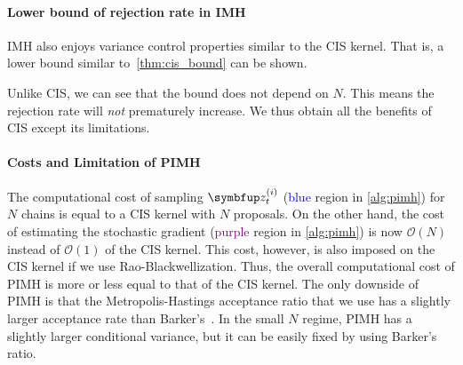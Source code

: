 \vspace{-0.1in}
\paragraph{Lower bound of rejection rate in IMH}
IMH also enjoys variance control properties similar to the CIS kernel.
That is, a lower bound similar to~\cref{thm:cis_bound} can be shown.
%

%
Unlike CIS, we can see that the bound does not depend on \(N\).
This means the rejection rate will \textit{not} prematurely increase.
We thus obtain all the benefits of CIS except its limitations.

\vspace{-0.1in}
\paragraph{Costs and Limitation of PIMH}
The computational cost of sampling \(\vz^{(i)}_{t}\) (\textcolor{blue}{blue} region in \cref{alg:pimh}) for \(N\) chains is equal to a CIS kernel with \(N\) proposals.
On the other hand, the cost of estimating the stochastic gradient (\textcolor{purple}{purple} region in \cref{alg:pimh}) is now \(\mathcal{O}(N)\) instead of \(\mathcal{O}(1)\) of the CIS kernel.
This cost, however, is also imposed on the CIS kernel if we use Rao-Blackwellization.
Thus, the overall computational cost of PIMH is more or less equal to that of the CIS kernel.
The only downside of PIMH is that the Metropolis-Hastings acceptance ratio that we use has a slightly larger acceptance rate than Barker's~\citep{peskun_optimum_1973, minh_understanding_2015}.
In the small \(N\) regime, PIMH has a slightly larger conditional variance, but it can be easily fixed by using Barker's ratio.

